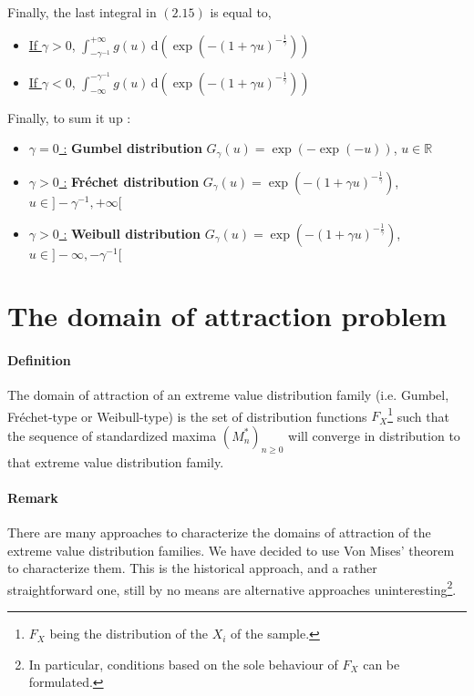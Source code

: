 Finally, the last integral in $(2.15)$ is equal to,
\begin{itemize}
	\item \underline{If $\gamma > 0$},  $\int_{ - \gamma^{-1}}^{+ \infty} \! g(u) \, \mathrm{d}(\exp(- (1 + \gamma u)^{- \frac{1}{\gamma}}))$ 
	\item \underline{If $\gamma < 0$},  $\int_{ - \infty}^{ - \gamma^{-1}} \! g(u) \, \mathrm{d}(\exp(- (1 + \gamma u)^{- \frac{1}{\gamma}}))$ 
\end{itemize}
Finally, to sum it up :
\begin{itemize}
	\item \underline{$\gamma = 0$ :} \textbf{Gumbel distribution} \newline
	$G_\gamma(u) = \exp(- \exp(- u))$, $u \in \mathbb{R}$
	\item \underline{$\gamma > 0$ :} \textbf{Fréchet distribution} \newline
	$G_\gamma(u) = \exp(- (1 + \gamma u)^{- \frac{1}{\gamma}})$, $u \in ]- \gamma^{-1}, + \infty[$
	\item \underline{$\gamma > 0$ :} \textbf{Weibull distribution} \newline
	$G_\gamma(u) = \exp(- (1 + \gamma u)^{- \frac{1}{\gamma}})$, $u \in ]- \infty, - \gamma^{-1}[$
\end{itemize}
\section{The domain of attraction problem}
\paragraph{Definition} The domain of attraction of an extreme value distribution family (i.e. Gumbel, Fréchet-type or Weibull-type) is the set of distribution functions $F_X$\footnote{$F_X$ being the distribution of the $X_i$ of the sample.} such that the sequence of standardized maxima $(M_n^*)_{n \ge 0}$ will converge in distribution to that extreme value distribution family.
\paragraph{Remark} There are many approaches to characterize the domains of attraction of the extreme value distribution families. We have decided to use Von Mises' theorem to characterize them. This is the historical approach, and a rather straightforward one, still by no means are alternative approaches uninteresting\footnote{In particular, conditions based on the sole behaviour of $F_X$ can be formulated.}.
